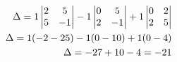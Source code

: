 \documentclass[preview]{standalone}
\begin{document}
\begin{align*}
\special{dvisvgm:raw <g id='unique000'>}\Delta = 1\begin{vmatrix} 2 & 5 \\ 5 & -1 \end{vmatrix} - 1\begin{vmatrix} 0 & 5 \\ 2 & -1 \end{vmatrix} + 1\begin{vmatrix} 0 & 2 \\ 2 & 5 \end{vmatrix} \special{dvisvgm:raw </g>}\special{dvisvgm:raw <g id='unique001'>}\\ \Delta = 1(-2-25) - 1(0-10) + 1(0-4) \special{dvisvgm:raw </g>}\special{dvisvgm:raw <g id='unique002'>}\\ \Delta = -27 + 10 - 4 = -21\special{dvisvgm:raw </g>}
\end{align*}
\end{document}
